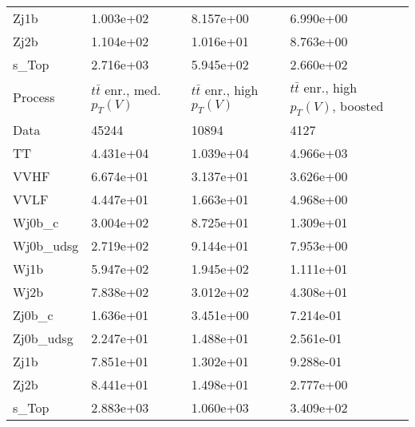 \begin{table}
{\begin{tabularx}{0.8\textwidth}{|X|X|X|X|}
Zj1b & 1.003e+02 & 8.157e+00 & 6.990e+00 \\
Zj2b & 1.104e+02 & 1.016e+01 & 8.763e+00 \\
s\_Top & 2.716e+03 & 5.945e+02 & 2.660e+02 \\
\hline
\hline
Process & $t\bar{t}$ enr., med. $p_{T}(V)$ & $t\bar{t}$ enr., high $p_{T}(V)$ & $t\bar{t}$ enr., high $p_{T}(V)$, boosted \\
\hline
Data & 45244 & 10894 & 4127 \\
\hline
TT & 4.431e+04 & 1.039e+04 & 4.966e+03 \\
VVHF & 6.674e+01 & 3.137e+01 & 3.626e+00 \\
VVLF & 4.447e+01 & 1.663e+01 & 4.968e+00 \\
Wj0b\_c & 3.004e+02 & 8.725e+01 & 1.309e+01 \\
Wj0b\_udsg & 2.719e+02 & 9.144e+01 & 7.953e+00 \\
Wj1b & 5.947e+02 & 1.945e+02 & 1.111e+01 \\
Wj2b & 7.838e+02 & 3.012e+02 & 4.308e+01 \\
Zj0b\_c & 1.636e+01 & 3.451e+00 & 7.214e-01 \\
Zj0b\_udsg & 2.247e+01 & 1.488e+01 & 2.561e-01 \\
Zj1b & 7.851e+01 & 1.302e+01 & 9.288e-01 \\
Zj2b & 8.441e+01 & 1.498e+01 & 2.777e+00 \\
s\_Top & 2.883e+03 & 1.060e+03 & 3.409e+02 \\
\hline
\end{tabularx}
}
\label{tab:cr-Wen-2017}
\end{table}


